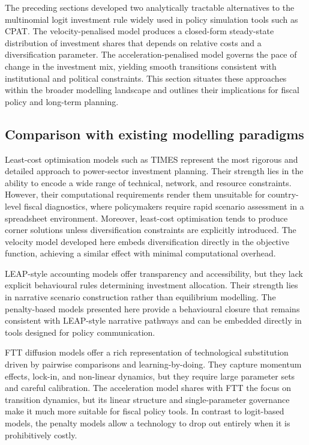 \documentclass[preprint,authoryear,12pt]{elsarticle}
\begin{document}
The preceding sections developed two analytically tractable alternatives to the multinomial logit
investment rule widely used in policy simulation tools such as CPAT. The velocity-penalised
model produces a closed-form steady-state distribution of investment shares that depends on
relative costs and a diversification parameter. The acceleration-penalised model governs the pace
of change in the investment mix, yielding smooth transitions consistent with institutional and
political constraints. This section situates these approaches within the broader modelling
landscape and outlines their implications for fiscal policy and long-term planning.

\subsection{Comparison with existing modelling paradigms}

Least-cost optimisation models such as TIMES represent the most rigorous and detailed approach
to power-sector investment planning. Their strength lies in the ability to encode a wide range of
technical, network, and resource constraints. However, their computational requirements render
them unsuitable for country-level fiscal diagnostics, where policymakers require rapid scenario
assessment in a spreadsheet environment. Moreover, least-cost optimisation tends to produce
corner solutions unless diversification constraints are explicitly introduced. The velocity model
developed here embeds diversification directly in the objective function, achieving a similar
effect with minimal computational overhead.

LEAP-style accounting models offer transparency and accessibility, but they lack explicit
behavioural rules determining investment allocation. Their strength lies in narrative scenario
construction rather than equilibrium modelling. The penalty-based models presented here provide
a behavioural closure that remains consistent with LEAP-style narrative pathways and can be
embedded directly in tools designed for policy communication.

FTT diffusion models offer a rich representation of technological substitution driven by pairwise
comparisons and learning-by-doing. They capture momentum effects, lock-in, and non-linear
dynamics, but they require large parameter sets and careful calibration. The acceleration model
shares with FTT the focus on transition dynamics, but its linear structure and single-parameter
governance make it much more suitable for fiscal policy tools. In contrast to logit-based models,
the penalty models allow a technology to drop out entirely when it is prohibitively costly.
\end{document}
